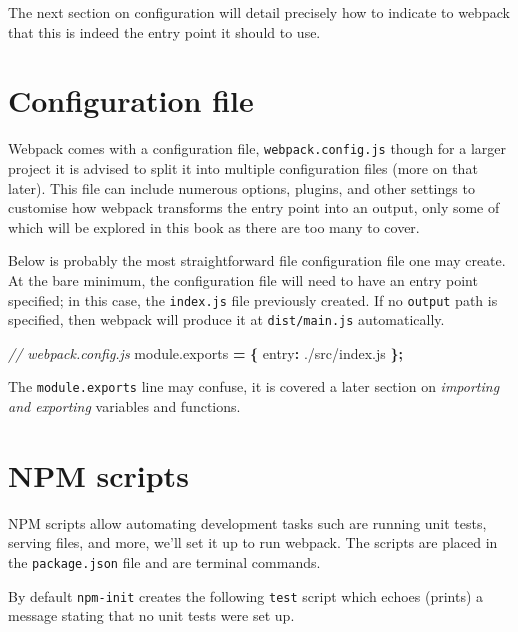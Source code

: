 \documentclass[
  10pt,
]{krantz}
\makeatletter
\newenvironment{Shaded}{\begin{snugshade}}{\end{snugshade}}
\newcommand{\AttributeTok}[1]{\textcolor[rgb]{0.61,0.61,0.61}{#1}}
\newcommand{\CommentTok}[1]{\textcolor[rgb]{0.37,0.37,0.37}{\textit{#1}}}
\newcommand{\DataTypeTok}[1]{\textcolor[rgb]{0.27,0.27,0.27}{#1}}
\newcommand{\NormalTok}[1]{#1}
\newcommand{\OperatorTok}[1]{\textcolor[rgb]{0.43,0.43,0.43}{\textbf{#1}}}
\newcommand{\StringTok}[1]{\textcolor[rgb]{0.5,0.5,0.5}{#1}}
\newcommand{\VariableTok}[1]{\textcolor[rgb]{0,0,0}{#1}}
\newenvironment{kframe}{%
\medskip{}
\setlength{\fboxsep}{.8em}
 \def\at@end@of@kframe{}%
 \ifinner\ifhmode%
  \def\at@end@of@kframe{\end{minipage}}%
  \begin{minipage}{\columnwidth}%
 \fi\fi%
 \def\FrameCommand##1{\hskip\@totalleftmargin \hskip-\fboxsep
 \colorbox{shadecolor}{##1}\hskip-\fboxsep
     \hskip-\linewidth \hskip-\@totalleftmargin \hskip\columnwidth}%
 \MakeFramed {\advance\hsize-\width
   \@totalleftmargin\z@ \linewidth\hsize
   \@setminipage}}%
 {\par\unskip\endMakeFramed%
 \at@end@of@kframe}
\renewenvironment{Shaded}{\begin{kframe}}{\end{kframe}}
\makeatother
\begin{document}
The next section on configuration will detail precisely how to indicate to webpack that this is indeed the entry point it should to use.

\hypertarget{webpack-intro-conf}{%
\section{Configuration file}\label{webpack-intro-conf}}

Webpack comes with a configuration file, \texttt{webpack.config.js} though for a larger project it is advised to split it into multiple configuration files (more on that later). This file can include numerous options, plugins, and other settings to customise how webpack transforms the entry point into an output, only some of which will be explored in this book as there are too many to cover.

Below is probably the most straightforward file configuration file one may create. At the bare minimum, the configuration file will need to have an entry point specified; in this case, the \texttt{index.js} file previously created. If no \texttt{output} path is specified, then webpack will produce it at \texttt{dist/main.js} automatically.

\begin{Shaded}
\begin{Highlighting}[]
\CommentTok{// webpack.config.js}
\VariableTok{module}\NormalTok{.}\AttributeTok{exports} \OperatorTok{=} \OperatorTok{\{}
  \DataTypeTok{entry}\OperatorTok{:} \StringTok{\textquotesingle{}./src/index.js\textquotesingle{}}
\OperatorTok{\};}
\end{Highlighting}
\end{Shaded}

The \texttt{module.exports} line may confuse, it is covered a later section on \emph{importing and exporting} variables and functions.

\hypertarget{webpack-intro-npm-scripts}{%
\section{NPM scripts}\label{webpack-intro-npm-scripts}}

NPM scripts allow automating development tasks such are running unit tests, serving files, and more, we'll set it up to run webpack. The scripts are placed in the \texttt{package.json} file and are terminal commands.

By default \texttt{npm-init} creates the following \texttt{test} script which echoes (prints) a message stating that no unit tests were set up.
\end{document}
